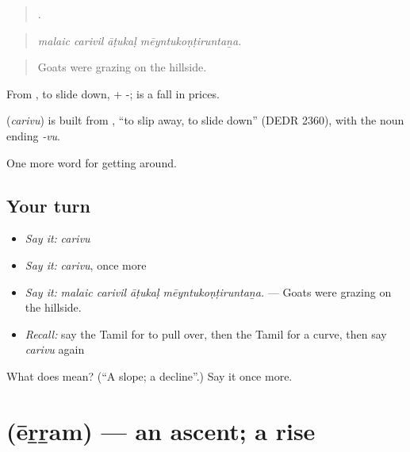 \begin{quote}
   .
\end{quote}

\begin{quote}
\emph{malaic carivil āṭukaḷ mēyntukoṇṭiruntaṉa.}
\end{quote}

\begin{quote}
Goats were grazing on the hillside.
\end{quote}

From , to slide down, + -;   is a fall in prices.

\begin{cousinweb}
\textbf{} (\emph{carivu}) is built from , \textquotedblleft{}to slip away, to slide down\textquotedblright{} (DEDR 2360), with the noun ending \emph{-vu}.
\end{cousinweb}

\begin{grammarlens}[title={What you've built}]
One more word for getting around.
\end{grammarlens}

\subsection*{Your turn}
\begin{itemize}
\raggedright
  \item \emph{Say it:} \emph{carivu}
  \item \emph{Say it:} \emph{carivu}, once more
  \item \emph{Say it:} \emph{malaic carivil āṭukaḷ mēyntukoṇṭiruntaṉa.} — Goats were grazing on the hillside.
  \item \emph{Recall:} say the Tamil for to pull over, then the Tamil for a curve, then say \emph{carivu} again
\end{itemize}

\begin{tcolorbox}[breakable,colback=teal!4,colframe=teal!35!black,title={Before you move on}]
What does  mean? (\textquotedblleft{}A slope; a decline\textquotedblright{}.) Say it once more.
\end{tcolorbox}
\section[\texorpdfstring{\ta{ஏற்றம்} (ēṟṟam)}{ஏற்றம் (ēṟṟam)}]{ (ēṟṟam) — an ascent; a rise}


